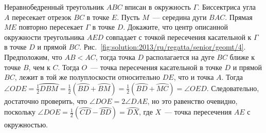 \problem
Неравнобедренный треугольник $ABC$ вписан в окружность $\Gamma$.
Биссектриса угла $A$ пересекает отрезок $BC$ в точке $E$.
Пусть $M$~--- середина дуги $BAC$.
Прямая $ME$ повторно пересекает $\Gamma$ в точке $D$.
Докажите, что центр описанной окружности треугольника $AED$ совпадает с точкой
пересечения касательной к $\Gamma$ в точке $D$ и прямой $BC$.
%
\label{solution:2013/ru/regatta/senior/geomt/4}%
Рис.~\ref{fig:solution:2013/ru/regatta/senior/geomt/4}.
Предположим, что $AB < AC$, тогда точка $D$ располагается на дуге $BC$ ближе к
точке $B$, чем к $C$.
Тогда $O$~--- точка пересечения касательной в точке $D$ и прямой $BC$, лежит в
той же полуплоскости относительно $DE$, что и точка $A$.
Тогда
\(
    \angle ODE
=
    \frac{1}{2} \wideparen{DBM}
=
    \frac{1}{2}(\wideparen{BD} + \wideparen{BM})
=
    \frac{1}{2} (\wideparen{BD} + \wideparen{MC})
=
    \angle OED
\).
Следовательно, достаточно проверить, что $\angle DOE = 2\angle DAE$, но это
равенство очевидно, поскольку
$\angle DOE = \frac{1}{2} (\wideparen{CD}-\wideparen{BD}) = \wideparen{DX}$,
где $X$~--- точка пересечения $AE$ с окружностью.
\endproblem
